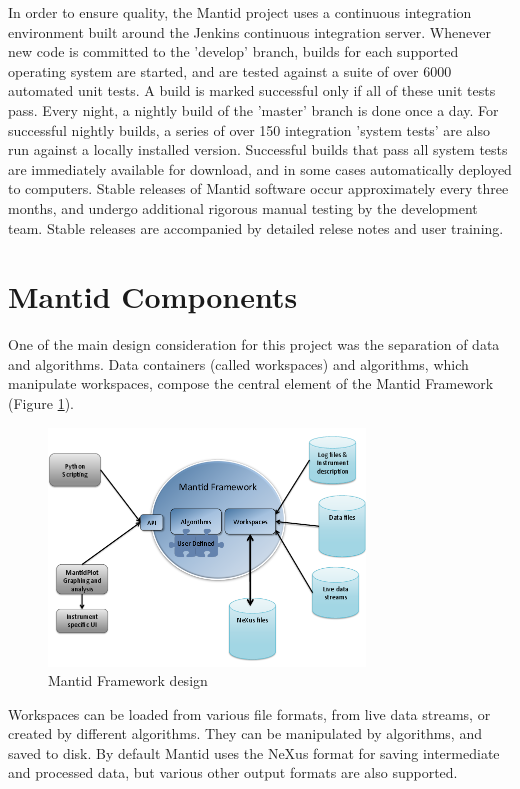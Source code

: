 \documentclass{elsarticle}
\begin{document}
In order to ensure quality, the Mantid project uses a continuous integration environment built around the Jenkins continuous integration server\cite{jenkins}. Whenever new code is committed to the 'develop' branch, builds for each supported operating system are started, and are tested against a suite of over 6000 automated unit tests. A build is marked successful only if all of these unit tests pass. Every night, a nightly build of the 'master' branch is done once a day. For successful nightly builds, a series of over 150 integration 'system tests' are also run against a locally installed version. Successful builds that pass all system tests are immediately available for download, and in some cases automatically deployed to computers. Stable releases of Mantid software occur approximately every three months, and undergo additional rigorous manual testing by the development team. Stable releases are accompanied by detailed relese notes and user training. 



\section{Mantid Components}
One of the main design consideration for this project was the separation of data and algorithms. Data containers (called workspaces) and algorithms, which manipulate workspaces, compose the central element of the Mantid Framework (Figure \ref{fig:Framework}). 
\begin{figure}[!ht]
\centerline{\includegraphics[width=0.75\textwidth]{MantidFramework.png}}
\caption{Mantid Framework design}
\label{fig:Framework}
\end{figure}
Workspaces can be loaded from various file formats, from live data streams, or created by different algorithms. They can be manipulated by algorithms, and saved to disk. By default Mantid uses the NeXus format for saving intermediate and processed data, but various other output formats are also supported.
\end{document}
